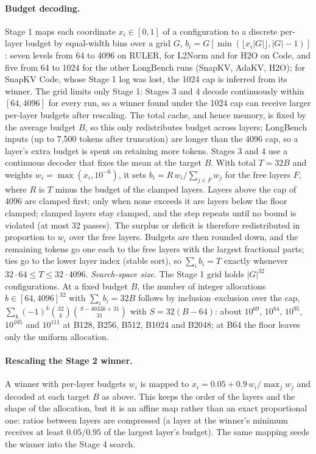 \paragraph{Budget decoding.} Stage 1 maps each coordinate $x_i \in [0,1]$ of a configuration to a discrete per-layer budget by equal-width bins over a grid $G$, $b_i = G[\min(\lfloor x_i |G| \rfloor, |G|-1)]$: seven levels from 64 to 4096 on RULER, for L2Norm and for H2O on Code, and five from 64 to 1024 for the other LongBench runs (SnapKV, AdaKV, H2O); for SnapKV Code, whose Stage 1 log was lost, the 1024 cap is inferred from its winner. The grid limits only Stage 1: Stages 3 and 4 decode continuously within $[64, 4096]$ for every run, so a winner found under the 1024 cap can receive larger per-layer budgets after rescaling. The total cache, and hence memory, is fixed by the average budget $B$, so this only redistributes budget across layers; LongBench inputs (up to 7{,}500 tokens after truncation) are longer than the 4096 cap, so a layer's extra budget is spent on retaining more tokens. Stages 3 and 4 use a continuous decoder that fixes the mean at the target $B$. With total $T = 32B$ and weights $w_i = \max(x_i, 10^{-6})$, it sets $b_i = R\,w_i / \sum_{j \in F} w_j$ for the free layers $F$, where $R$ is $T$ minus the budget of the clamped layers. Layers above the cap of 4096 are clamped first; only when none exceeds it are layers below the floor clamped; clamped layers stay clamped, and the step repeats until no bound is violated (at most 32 passes). The surplus or deficit is therefore redistributed in proportion to $w_i$ over the free layers. Budgets are then rounded down, and the remaining tokens go one each to the free layers with the largest fractional parts; ties go to the lower layer index (stable sort), so $\sum_i b_i = T$ exactly whenever $32 \cdot 64 \le T \le 32 \cdot 4096$. \emph{Search-space size.} The Stage 1 grid holds $|G|^{32}$ configurations. At a fixed budget $B$, the number of integer allocations $b \in [64, 4096]^{32}$ with $\sum_i b_i = 32B$ follows by inclusion--exclusion over the cap, $\sum_k (-1)^k {32 \choose k}{S - 4033k + 31 \choose 31}$ with $S = 32(B - 64)$: about $10^{69}$, $10^{84}$, $10^{95}$, $10^{105}$ and $10^{111}$ at B128, B256, B512, B1024 and B2048; at B64 the floor leaves only the uniform allocation.

\paragraph{Rescaling the Stage 2 winner.} A winner with per-layer budgets $w_i$ is mapped to $x_i = 0.05 + 0.9\,w_i / \max_j w_j$ and decoded at each target $B$ as above. This keeps the order of the layers and the shape of the allocation, but it is an affine map rather than an exact proportional one: ratios between layers are compressed (a layer at the winner's minimum receives at least $0.05/0.95$ of the largest layer's budget). The same mapping seeds the winner into the Stage 4 search.

